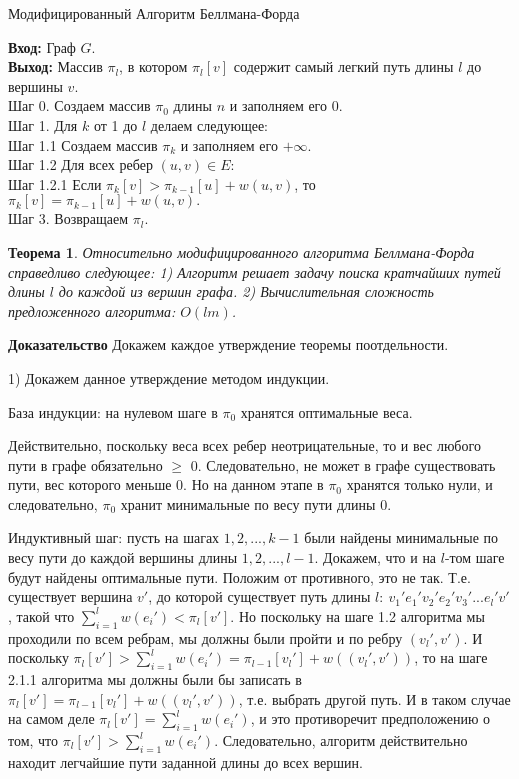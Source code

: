 \documentclass[a4paper,12pt]{report}
\theoremstyle{plain} %
\newtheorem{Theorem}{Теорема}[chapter]
\theoremstyle{definition}
\theoremstyle{remark}
\begin{document}
\begin{large}
\begin{algorithm}
\caption{Модифицированный Алгоритм Беллмана-Форда}
\label{diff_graph_construct}
\textbf{Вход:} Граф $G$.\\
\textbf{Выход:} Массив $\pi_l$, в котором $\pi_l[v]$ содержит самый легкий путь длины $l$ до вершины $v$.\\
Шаг 0. Создаем массив $\pi_0$ длины $n$ и заполняем его $0$. \\
Шаг 1. Для $k$ от 1 до $l$ делаем следующее:\\
Шаг 1.1 Создаем массив $\pi_k$ и заполняем его $+\infty$.\\
Шаг 1.2 Для всех ребер $(u, v) \in E:$\\
Шаг 1.2.1 Если $\pi_k[v] > \pi_{k-1}[u] + w(u,v)$, то $\pi_k[v] = \pi_{k-1}[u] + w(u,v).$\\
Шаг 3. Возвращаем $\pi_l$.\\
\end{algorithm}

\begin{Theorem}
Относительно модифицированного алгоритма Беллмана-Форда справедливо следующее:
1) Алгоритм решает задачу поиска кратчайших путей длины $l$ до каждой из вершин графа.
2) Вычислительная сложность предложенного алгоритма: $O(lm)$.
\end{Theorem}
\textbf{Доказательство}
Докажем каждое утверждение теоремы поотдельности.

1) Докажем данное утверждение методом индукции.

База индукции: на нулевом шаге в $\pi_0$ хранятся оптимальные веса.

Действительно, поскольку веса всех ребер неотрицательные, то и вес любого пути в графе обязательно $\ge$ 0. Следовательно, не может в графе существовать пути, вес которого меньше 0. Но на данном этапе в $\pi_0$ хранятся только нули, и следовательно, $\pi_0$ хранит минимальные по весу пути длины 0.

Индуктивный шаг: пусть на шагах $1, 2, ..., k-1$ были найдены минимальные по весу пути до каждой вершины длины $1, 2, ..., l-1$. Докажем, что и на $l$-том шаге будут найдены оптимальные пути. Положим от противного, это не так. Т.е. существует вершина $v'$, до которой существует путь длины $l: ~ v_1'e_1'v_2'e_2'v_3'...e_l'v'$, такой что $\sum_{i=1}^l w(e_i') < \pi_l[v']$. Но поскольку на шаге 1.2 алгоритма мы проходили по всем ребрам, мы должны были пройти и по ребру $(v_l', v')$. И поскольку $\pi_l[v'] > \sum_{i=1}^l w(e_i') = \pi_{l-1}[v_{l}'] + w( (v_l', v'))$, то на шаге 2.1.1 алгоритма мы должны были бы записать в $\pi_l[v'] = \pi_{l-1}[v_{l}'] + w( (v_l', v'))$, т.е. выбрать другой путь. И в таком случае на самом деле $\pi_l[v'] =  \sum_{i=1}^l w(e_i') $, и это противоречит предположению о том, что $\pi_l[v'] > \sum_{i=1}^l w(e_i')$. Следовательно, алгоритм действительно находит легчайшие пути заданной длины до всех вершин.


\end{large}
\end{document}
